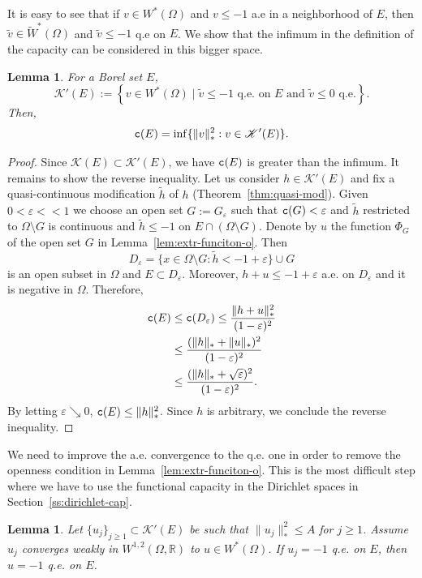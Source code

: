 \documentclass{amsart}
\newcommand{\wt}[1]{\widetilde{#1}}
\newcommand{\veps}{\varepsilon}
\newcommand{\tc}{{\tt c}}
\newcommand{\Om}{\Omega}
\newcommand{\bR}{\mathbb{R}}
\newcommand{\cali}[1]{\mathscr{#1}}
\newcommand{\Kc}{\cali{K}}
\newtheorem{lem}[thm]{Lemma}
\theoremstyle{definition}
\numberwithin{thm}{section}
\numberwithin{equation}{section}
\renewcommand{\[}{\begin{equation}}
\renewcommand{\]}{\end{equation}}
\begin{document}
It is easy to see that if $v\in W^*(\Om)$ and $v\leq -1$ a.e in a neighborhood of $E$, then $\wt v\in \wt W^*(\Om)$ and $\wt v\leq -1$ q.e on $E$. We show that the infimum in the definition of the capacity can be considered in this bigger space.  

\begin{lem}\label{lem:defn-cap-mod} For a Borel set $E$, 
 $$
 	\Kc'(E) := \left\{ v \in W^*(\Om) \;\rvert\; \wt v \leq  -1 \text{ q.e. on $E$ and } \wt v\leq 0 \text{ q.e.}\right\}.
$$
Then,
$$
	\tc(E) = \inf\{\|v\|_*^2 : v \in \Kc'(E)\}.
$$
\end{lem}


\begin{proof} Since $\Kc(E) \subset \Kc'(E)$, we have $\tc (E)$ is greater than the infimum. It remains 
to show the reverse  inequality. 
Let us consider $h\in  \Kc'(E)$ and fix a quasi-continuous modification $\wt h$ of $h$ (Theorem~\ref{thm:quasi-mod}). Given $0< \veps <<1$ we choose an open set $G:= G_\veps$ such that $\tc (G)<\veps$ and $\wt h$ restricted to $\Om\setminus G$ is continuous and $\wt h \leq -1$ on $E \cap (\Om\setminus G)$. Denote  by $u$ the function $\Phi_{G}$ of  the open set $G$ in Lemma~\ref{lem:extr-funciton-o}. Then
$$
	D_\veps = \{x\in \Om \setminus G: \wt h < -1+\veps \} \cup G
$$
is an open subset in $\Om$ and $E\subset D_\veps$. Moreover, $h + u \leq -1 + \veps$ a.e. on $D_\veps$ and it is negative in $\Om$.
Therefore,
$$\begin{aligned}
	\tc (E) &\leq \tc (D_\veps) \leq \frac{\|h+u\|_*^2}{(1-\veps)^2}  \\& \leq \frac{ (\|h\|_* +\|u\|_*)^2}{(1-\veps)^2} \\ &\leq \frac{ (\|h\|_* + \sqrt{\veps})^2}{(1-\veps)^2}.
\end{aligned}$$
By letting $\veps \searrow 0$, $\tc(E) \leq \|h\|_*^2$. Since $h$ is arbitrary,  we conclude  the reverse  inequality.
\end{proof}

We need to improve the a.e. convergence  to the q.e. one in order  to remove the openness condition in Lemma~\ref{lem:extr-funciton-o}. This is the most difficult step where we have to use the functional capacity in the Dirichlet spaces in Section~\ref{ss:dirichlet-cap}.

\begin{lem}\label{lem:qe-limit} Let $\{u_j\}_{j\geq 1} \subset \Kc'(E)$ be such that  $ \|u_j\|_*^2 \leq A$ for $j\geq 1$. Assume $u_j $ converges weakly in $W^{1,2}(\Om,\bR)$ to $u\in W^*(\Om)$. If $u_j = -1$ q.e. on $E$, then $u = -1$ q.e. on $E$.
\end{lem}
\end{document}

